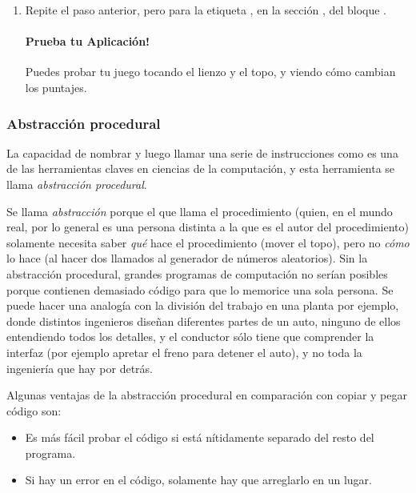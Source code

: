 {\begin{enumerate}
\begin{itemize}
\end{itemize}

\item Repite el paso anterior, pero para la etiqueta
  , en la sección , del
  bloque .

  \paragraph{Prueba tu Aplicación!} Puedes probar tu juego tocando el
  lienzo y el topo, y viendo cómo cambian los puntajes.

\end{enumerate}

\subsubsection*{Abstracción procedural}

La capacidad de nombrar y luego llamar una serie de instrucciones como
 es una de las herramientas claves en ciencias de
la computación, y esta herramienta se llama \emph{abstracción
  procedural}.

Se llama \emph{abstracción} porque el que llama el procedimiento
(quien, en el mundo real, por lo general es una persona distinta a la
que es el autor del procedimiento) solamente necesita saber \emph{qué}
hace el procedimiento (mover el topo), pero no \emph{cómo} lo hace (al
hacer dos llamados al generador de números aleatorios). Sin la
abstracción procedural, grandes programas de computación no serían
posibles porque contienen demasiado código para que lo memorice una
sola persona. Se puede hacer una analogía con la división del trabajo
en una planta por ejemplo, donde distintos ingenieros diseñan
diferentes partes de un auto, ninguno de ellos entendiendo todos los
detalles, y el conductor sólo tiene que comprender la interfaz (por
ejemplo apretar el freno para detener el auto), y no toda la
ingeniería que hay por detrás.

Algunas ventajas de la abstracción procedural en comparación con
copiar y pegar código son:

\begin{itemize}

\item Es más fácil probar el código si está nítidamente separado del
  resto del programa.

\item Si hay un error en el código, solamente hay que arreglarlo en un
  lugar.


\end{itemize}}

